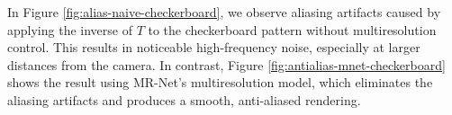 In Figure \ref{fig:alias-naive-checkerboard}, we observe aliasing artifacts caused by applying the inverse of \(T\) to the checkerboard pattern without multiresolution control. This results in noticeable high-frequency noise, especially at larger distances from the camera. In contrast, Figure \ref{fig:antialias-mnet-checkerboard} shows the result using MR-Net's multiresolution model, which eliminates the aliasing artifacts and produces a smooth, anti-aliased rendering.


